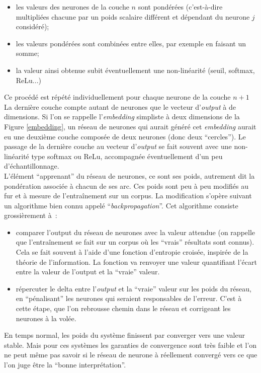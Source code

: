 \documentclass{article}
\begin{document}
					\begin{itemize}
						\item les valeurs des neurones de la couche $n$ sont pondérées (c'est-à-dire multipliées chacune par un poids scalaire différent et dépendant du neurone $j$ considéré);
						\item les valeurs pondérées sont combinées entre elles, par exemple en faisant un somme;
						\item la valeur ainsi obtenue subit éventuellement une non-linéarité (seuil, softmax, ReLu...)
					\end{itemize}
					Ce procédé est répété individuellement pour chaque neurone de la couche $n+1$\\
					La dernière couche compte autant de neurones que le vecteur d'\textit{output} à de dimensions. Si l'on se rappelle l'\textit{embedding} simpliste à deux dimensions de la Figure \ref{embedding}, un réseau de neurones qui aurait généré cet \textit{embedding} aurait eu une deuxième couche composée de deux neurones (donc deux ``cercles''). Le passage de la dernière couche au vecteur d'\textit{output} se fait souvent avec une non-linéarité type softmax ou ReLu, accompagnée éventuellement d'un peu d'échantillonnage.\\
					L'élément ``apprenant'' du réseau de neurones, ce sont ses poids, autrement dit la pondération associée à chacun de ses arc. Ces poids sont peu à peu modifiés au fur et à mesure de l'entraînement sur un corpus. La modification s'opère suivant un algorithme bien connu appelé ``\textit{backpropagation}''. Cet algorithme consiste grossièrement à~:
					\begin{itemize}
						\item comparer l'output du réseau de neurones avec la valeur attendue (on rappelle que l'entraînement se fait sur un corpus où les ``vrais'' résultats sont connus). Cela se fait souvent à  l'aide d'une fonction d'entropie croisée, inspirée de la théorie de l'information. La fonction va renvoyer une valeur quantifiant l'écart entre la valeur de l'output et la ``vraie'' valeur.
						\item répercuter le delta entre l'\textit{output} et la ``vraie'' valeur sur les poids du réseau, en ``pénalisant'' les neurones qui seraient responsables de l'erreur. C'est à cette étape, que l'on rebrousse chemin dans le réseau et corrigeant les neurones à la volée.
					\end{itemize}
					En temps normal, les poids du système finissent par converger vers une valeur stable. Mais pour ces systèmes les garanties de convergence sont très faible et l'on ne peut même pas savoir si le réseau de neurone à réellement convergé vers ce que l'on juge être la ``bonne interprétation''.
\end{document}
